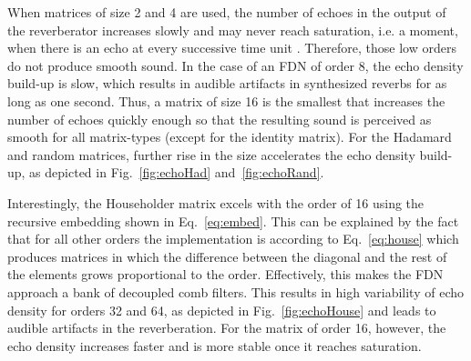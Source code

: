 \documentclass[twoside,a4paper]{article}
\begin{document}
When matrices of size 2 and 4 are used, the number of echoes in the output of the reverberator increases slowly and may never reach saturation, i.e. a moment, when there is an echo at every successive time unit \cite{schlecht:2016:echo}. Therefore, those low orders do not produce smooth sound. In the case of an FDN of order 8, the echo density build-up is slow, which results in audible artifacts in synthesized reverbs for as long as one second. Thus, a matrix of size 16 is the smallest that increases the number of echoes quickly enough so that the resulting sound is perceived as smooth for all matrix-types (except for the identity matrix). For the Hadamard and random matrices, further rise in the size accelerates the echo density build-up, as depicted in Fig.~\ref{fig:echoHad} and~\ref{fig:echoRand}.

Interestingly, the Householder matrix excels with the order of 16 using the recursive embedding shown in Eq.~\eqref{eq:embed}. This can be explained by the fact that for all other orders the implementation is according to Eq.~\eqref{eq:house} which produces matrices in which the difference between the diagonal and the rest of the elements grows proportional to the order. Effectively, this makes the FDN approach a bank of decoupled comb filters. This results in high variability of echo density for orders 32 and 64, as depicted in Fig.~\ref{fig:echoHouse} and leads to audible artifacts in the reverberation. For the matrix of order 16, however, the echo density increases faster and is more stable once it reaches saturation.
\end{document}
